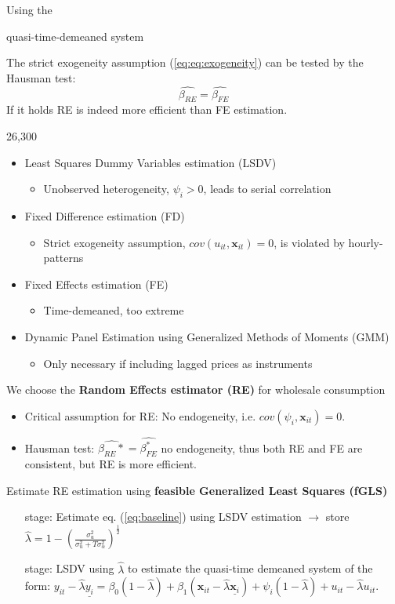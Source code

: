 Using the

quasi-time-demeaned system

The strict exogeneity assumption (\ref{eq:eq:exogeneity}) can be tested by the Hausman test:
\begin{equation}
  \widehat{\beta_{RE}}=\widehat{\beta_{FE}}
  \label{eq:hausman}
\end{equation}
If it holds RE is indeed more efficient than FE estimation.

26,300

\begin{itemize}
    \item Least Squares Dummy Variables estimation (LSDV)
    \begin{itemize}
        \item Unobserved heterogeneity, $\psi_i>0$, leads to serial correlation
    \end{itemize}
    \item Fixed Difference estimation (FD)
    \begin{itemize}
        \item Strict exogeneity assumption, $cov(u_{it},\bm{x}_{it})=0$, is violated by hourly-patterns
    \end{itemize}
    \item Fixed Effects estimation (FE)
    \begin{itemize}
        \item Time-demeaned, too extreme
    \end{itemize}
    \item Dynamic Panel Estimation using Generalized Methods of Moments (GMM)
    \begin{itemize}
        \item Only necessary if including lagged prices as instruments
    \end{itemize}
\end{itemize}
We choose the \textbf{Random Effects estimator (RE)} for wholesale consumption
\begin{itemize}
    \item Critical assumption for RE: No endogeneity, i.e. $cov(\psi_i,\bm{x}_{it})=0$.
    \item Hausman test: $\widehat{\beta_{RE}{*}}=\widehat{\beta_{FE}^{*}}$ no endogeneity, thus both RE and FE are consistent, but RE is more efficient.
\end{itemize}
Estimate RE estimation using \textbf{feasible Generalized Least Squares (fGLS)}
\begin{itemize}
    \item[\nth{1} stage:] Estimate eq. (\ref{eq:baseline}) using LSDV estimation $\rightarrow$ store $\widehat{\lambda}=1-\left(\frac{\sigma^2_u}{\sigma^2_u+T\sigma^2_\alpha}\right)^\frac{1}{2}$
    \item[\nth{2} stage:] LSDV using $\widehat{\lambda}$ to estimate the quasi-time demeaned system of the form: $y_{it}-\widehat{\lambda}\underline{y_i}=\beta_0(1-\widehat{\lambda})+\beta_1(\bm{x}_{it}-\widehat{\lambda}\underline{\bm{x}_i})+\psi_i(1-\widehat{\lambda})+u_{it}-\widehat{\lambda}u_{it}$.
\end{itemize}

